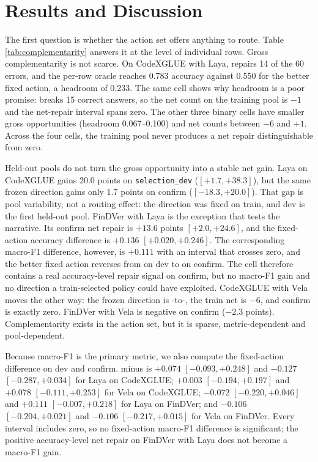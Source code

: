\section{Results and Discussion}
\label{sec:results}



The first question is whether the action set offers anything to route. Table
\ref{tab:complementarity} answers it at the level of individual rows. Gross
complementarity is not scarce. On CodeXGLUE with Laya, \choice{} repairs 14 of
the 60 \noul{} errors, and the per-row oracle reaches 0.783 accuracy against
0.550 for the better fixed action, a headroom of 0.233. The same cell shows why
headroom is a poor promise: \choice{} breaks 15 correct \noul{} answers, so the
net count on the training pool is $-1$ and the net-repair interval spans zero.
The other three binary cells have smaller gross opportunities (headroom
0.067--0.100) and net counts between $-6$ and $+1$. Across the four cells, the
training pool never produces a net repair distinguishable from zero.

Held-out pools do not turn the gross opportunity into a stable net gain.
Laya on CodeXGLUE gains 20.0 points on \texttt{selection\_dev}
($[+1.7,+38.3]$), but the same frozen direction gains only 1.7 points on confirm
($[-18.3,+20.0]$). That gap is pool variability, not a routing effect: the
direction was fixed on train, and dev is the first held-out pool. FinDVer with Laya is the
exception that tests the narrative. Its confirm net repair is $+13.6$ points
$[+2.0,+24.6]$, and the fixed-action accuracy difference is $+0.136$
$[+0.020,+0.246]$. The corresponding macro-F1 difference, however, is $+0.111$
with an interval that crosses zero, and the better fixed action reverses from
\noul{} on dev to \choice{} on confirm. The cell therefore contains a real
accuracy-level repair signal on confirm, but no macro-F1 gain and no direction
a train-selected policy could have exploited. CodeXGLUE
with Vela moves the other way: the frozen direction is \choice{}-to-\noul{},
the train net is $-6$, and confirm is exactly zero. FinDVer with Vela is negative
on confirm ($-2.3$ points). Complementarity exists in the action set, but it is
sparse, metric-dependent and pool-dependent.

Because macro-F1 is the primary metric, we also compute the fixed-action
difference on dev and confirm. \choice{} minus \noul{} is $+0.074$
$[-0.093,+0.248]$ and $-0.127$ $[-0.287,+0.034]$ for Laya on CodeXGLUE; $+0.003$
$[-0.194,+0.197]$ and $+0.078$ $[-0.111,+0.253]$ for Vela on CodeXGLUE; $-0.072$
$[-0.220,+0.046]$ and $+0.111$ $[-0.007,+0.218]$ for Laya on FinDVer; and
$-0.106$ $[-0.204,+0.021]$ and $-0.106$ $[-0.217,+0.015]$ for Vela on FinDVer.
Every interval includes zero, so no fixed-action macro-F1 difference is
significant; the positive accuracy-level net repair on FinDVer with Laya does
not become a macro-F1 gain.

